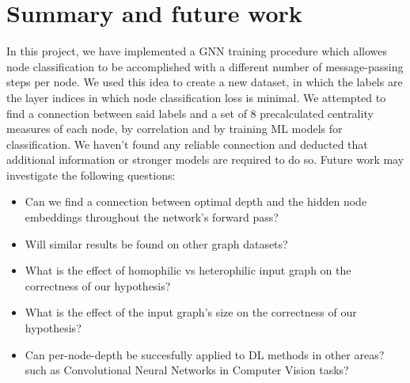 \documentclass[11pt,a4paper]{article}
\begin{document}
\pagebreak
\section{Summary and future work}
\label{sec:SummaryFuture}
In this project, we have implemented a GNN training procedure which allowes node classification to be accomplished with a different number of message-passing steps per node. We used this idea to create a new dataset, in which the labels are the layer indices in which node classification loss is minimal. We attempted to find a connection between said labels and a set of 8 precalculated centrality measures of each node, by correlation and by training ML models for classification. We haven't found any reliable connection and deducted that additional information or stronger models are required to do so. Future work may investigate the following questions:
\begin{itemize}
	\item Can we find a connection between optimal depth and the hidden node embeddings throughout the network's forward pass?
	\item Will similar results be found on other graph datasets?
	\item What is the effect of homophilic vs heterophilic input graph on the correctness of our hypothesis?
	\item What is the effect of the input graph's size on the correctness of our hypothesis?
	\item Can per-node-depth be succesfully applied to DL methods in other areas? such as Convolutional Neural Networks in Computer Vision tasks?
\end{itemize}




\end{document}
